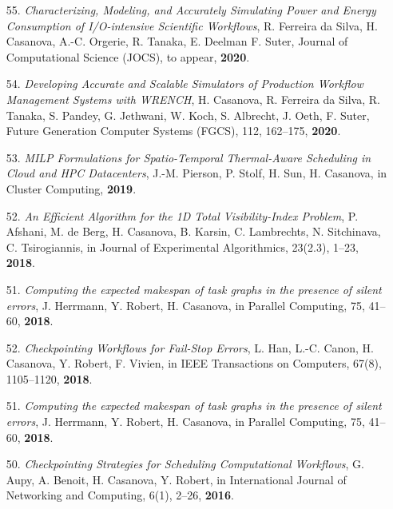 
\begin{enumerate}

\item [55.] {\it Characterizing, Modeling, and Accurately Simulating Power and Energy Consumption of I/O-intensive Scientific Workflows}, 
R. Ferreira da Silva, H. Casanova, A.-C. Orgerie, R. Tanaka, E. Deelman F. Suter,
Journal of Computational Science (JOCS), to appear, {\bf 2020}.

\item [54.] {\it Developing Accurate and Scalable Simulators of Production
Workflow Management Systems with WRENCH}, H. Casanova, R. Ferreira da
Silva, R. Tanaka, S. Pandey, G. Jethwani, W. Koch, S. Albrecht, J. Oeth, F.
Suter, Future Generation Computer Systems (FGCS), 112, 162--175,
{\bf 2020}.

\item [53.] {\it MILP Formulations for Spatio-Temporal Thermal-Aware Scheduling in Cloud and HPC Datacenters}, J.-M. Pierson, P. Stolf, H. Sun, H. Casanova,   in Cluster Computing, {\bf 2019}.

\item [52.] {\it An Efficient Algorithm for the 1D Total Visibility-Index
Problem}, P. Afshani, M. de Berg, H. Casanova, B. Karsin, C. Lambrechts, N.
Sitchinava, C. Tsirogiannis, in Journal of Experimental Algorithmics,
23(2.3), 1--23, {\bf 2018}.

\item [51.] {\it Computing the expected makespan of task graphs in the presence of silent errors}, J. Herrmann, Y. Robert, H. Casanova,  in Parallel Computing, 75, 41--60, {\bf 2018}.

\item [52.] {\it Checkpointing Workflows for Fail-Stop Errors},
L. Han, L.-C. Canon, H. Casanova, Y. Robert, F. Vivien,
in IEEE Transactions on Computers, 67(8), 1105--1120, {\bf 2018}.

\item [51.] {\it Computing the expected makespan of task graphs in the presence of silent errors}, J. Herrmann, Y. Robert, H. Casanova,  in Parallel Computing, 75, 41--60, {\bf 2018}.

\item [50.] {\it Checkpointing Strategies for Scheduling Computational Workflows}, G. Aupy, A. Benoit, H. Casanova, Y.  Robert, in International
Journal of Networking and Computing, 6(1), 2--26, {\bf 2016}.


\end{enumerate}
